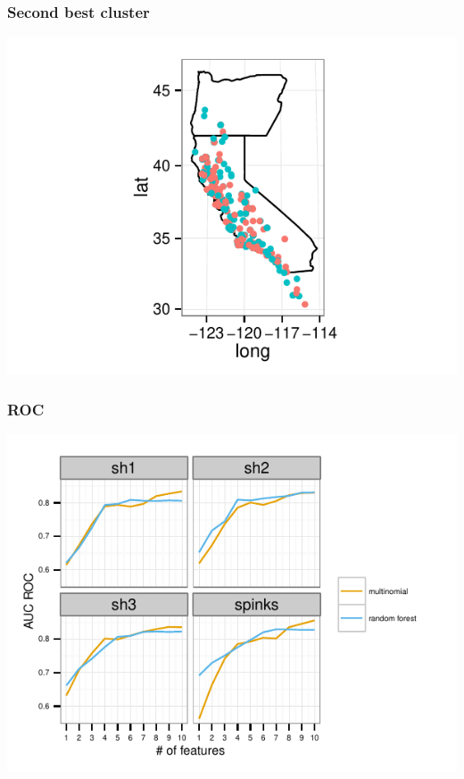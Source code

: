 \documentclass{beamer}\usepackage{graphicx, color}
\makeatletter
\def\maxwidth{ %
  \ifdim\Gin@nat@width>\linewidth
    \linewidth
  \else
    \Gin@nat@width
  \fi
}
\newenvironment{knitrout}{}{} %
\makeatother
\begin{document}
\begin{frame}
  \frametitle{Second best cluster}
\begin{knitrout}
\color{fgcolor}
\includegraphics[width=\maxwidth]{figure/unnamed-chunk-3} 

\end{knitrout}


\end{frame}

%

\begin{frame}[fragile]
  \frametitle{ROC}
\begin{knitrout}
\color{fgcolor}
\includegraphics[width=\maxwidth]{figure/roc} 

\end{knitrout}


\end{frame}
\end{document}
